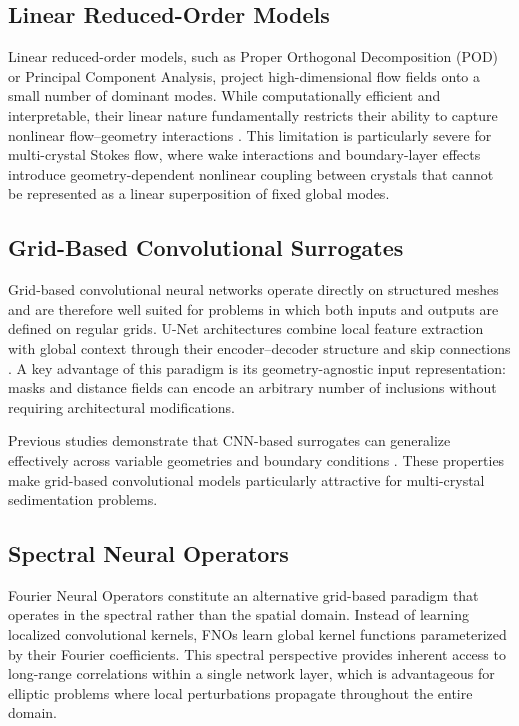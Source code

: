 \subsection{Linear Reduced-Order Models}

Linear reduced-order models, such as Proper Orthogonal Decomposition (POD) \parencite{berkooz_proper_1993,sirovich_turbulence_1987} or Principal Component Analysis, project high-dimensional flow fields onto a small number of dominant modes. While computationally efficient and interpretable, their linear nature fundamentally restricts their ability to capture nonlinear flow–geometry interactions \parencite{lu_comprehensive_2022}. This limitation is particularly severe for multi-crystal Stokes flow, where wake interactions and boundary-layer effects introduce geometry-dependent nonlinear coupling between crystals that cannot be represented as a linear superposition of fixed global modes.

\subsection{Grid-Based Convolutional Surrogates}

Grid-based convolutional neural networks operate directly on structured meshes and are therefore well suited for problems in which both inputs and outputs are defined on regular grids. U-Net architectures combine local feature extraction with global context through their encoder–decoder structure and skip connections \parencite{ronneberger_u-net_2015}. A key advantage of this paradigm is its geometry-agnostic input representation: masks and distance fields can encode an arbitrary number of inclusions without requiring architectural modifications.

Previous studies demonstrate that CNN-based surrogates can generalize effectively across variable geometries and boundary conditions \parencite{thuerey_deep_2020}. These properties make grid-based convolutional models
particularly attractive for multi-crystal sedimentation problems.

\subsection{Spectral Neural Operators}

Fourier Neural Operators \parencite{li_fourier_2021} constitute an alternative grid-based paradigm that operates in the spectral rather than the spatial domain. Instead of learning localized convolutional kernels, FNOs learn
global kernel functions parameterized by their Fourier coefficients. This spectral perspective provides inherent access to long-range correlations within a single network layer, which is advantageous for elliptic problems
where local perturbations propagate throughout the entire domain.

